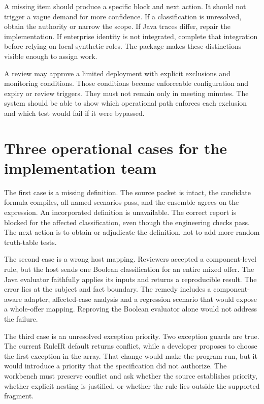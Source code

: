 A missing item should produce a specific block and next action. It should not
trigger a vague demand for more confidence. If a classification is unresolved,
obtain the authority or narrow the scope. If Java traces differ, repair the
implementation. If enterprise identity is not integrated, complete that integration
before relying on local synthetic roles. The package makes these distinctions
visible enough to assign work.

A review may approve a limited deployment with explicit exclusions and monitoring
conditions. Those conditions become enforceable configuration and expiry or
review triggers. They must not remain only in meeting minutes. The system should
be able to show which operational path enforces each exclusion and which test
would fail if it were bypassed.

\section{Three operational cases for the implementation team}
\label{merge:M10:12}


The first case is a missing definition. The source packet is intact, the candidate
formula compiles, all named scenarios pass, and the ensemble agrees on the
expression. An incorporated definition is unavailable. The correct report is
blocked for the affected classification, even though the engineering checks pass.
The next action is to obtain or adjudicate the definition, not to add more random
truth-table tests.

The second case is a wrong host mapping. Reviewers accepted a component-level
rule, but the host sends one Boolean classification for an entire mixed offer.
The Java evaluator faithfully applies its inputs and returns a reproducible
result. The error lies at the subject and fact boundary. The remedy includes a
component-aware adapter, affected-case analysis and a regression scenario that
would expose a whole-offer mapping. Reproving the Boolean evaluator alone would
not address the failure.


The third case is an unresolved exception priority. Two exception guards are
true. The current RuleIR default returns conflict, while a developer proposes to
choose the first exception in the array. That change would make the program run,
but it would introduce a priority that the specification did not authorize. The
workbench must preserve conflict and ask whether the source establishes priority,
whether explicit nesting is justified, or whether the rule lies outside the
supported fragment.

